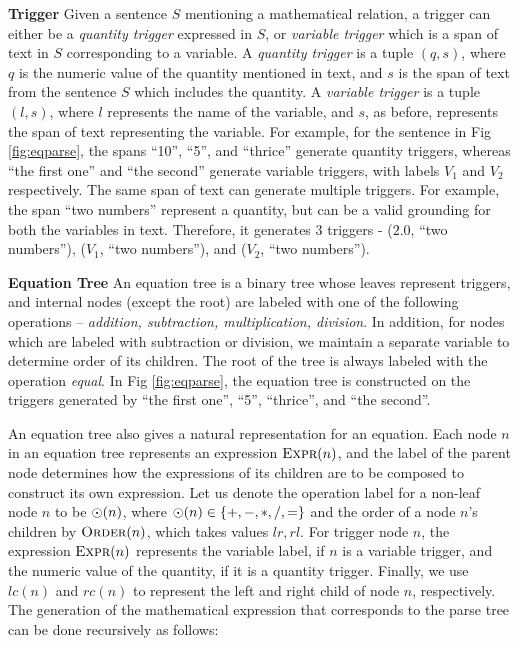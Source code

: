   \noindent \textbf{Trigger} Given a sentence $S$ mentioning a
  mathematical relation, a trigger can either be a {\em quantity
    trigger} expressed in $S$, or {\em variable trigger} which is a
  span of text in $S$ corresponding to a variable. A {\em quantity
    trigger} is a tuple $(q, s)$, where $q$ is the numeric value of
  the quantity mentioned in text, and $s$ is the span of text from the
  sentence $S$ which includes the quantity. A {\em variable trigger}
  is a tuple $(l, s)$, where $l$ represents the name of the variable,
  and $s$, as before, represents the span of text representing the
  variable. For example, for the sentence in Fig \ref{fig:eqparse},
  the spans ``10'', ``5'', and ``thrice'' generate quantity triggers,
  whereas ``the first one'' and ``the second'' generate variable
  triggers, with labels $V_1$ and $V_2$ respectively. The same span of
  text can generate multiple triggers.  For example, the span ``two
  numbers'' represent a quantity, but can be a valid grounding for
  both the variables in text. Therefore, it generates $3$ triggers -
  ($2.0$, ``two numbers''), ($V_1$, ``two numbers''), and ($V_2$,
  ``two numbers'').

  \noindent \textbf{Equation Tree} An equation tree is a binary tree
  whose leaves represent triggers, and internal nodes (except the
  root) are labeled with one of the following operations -- {\em addition,
  subtraction, multiplication, division}. In addition, for nodes which
  are labeled with subtraction or division, we maintain a separate
  variable to determine order of its children. The root of the tree is
  always labeled with the operation {\em equal}. In Fig \ref{fig:eqparse},
  the equation tree is constructed on the triggers generated by ``the
  first one'', ``5'', ``thrice'', and ``the second''. 

  An equation tree also gives a natural representation for an
  equation. Each node $n$ in an equation tree represents an expression
  $\operatorname{\textsc{Expr}}(n)$, and the label of the parent node determines how the
  expressions of its children are to be composed to construct its own
  expression. Let us denote the operation label for a non-leaf node
  $n$ to be $\operatorname{\odot}(n)$, where $\operatorname{\odot}(n) \in \{+, -, *, /, =\}$ and the
  order of a node $n$'s children by $\operatorname{\textsc{Order}}(n)$, which takes values
  ${lr, rl}$. For trigger node $n$, the expression $\operatorname{\textsc{Expr}}(n)$
  represents the variable label, if $n$ is a variable trigger, and the
  numeric value of the quantity, if it is a quantity trigger. Finally,
  we use $lc(n)$ and $rc(n)$ to represent the left and right child of
  node $n$, respectively. The generation of the mathematical
  expression that corresponds to the parse tree can be done
  recursively as follows:
  
